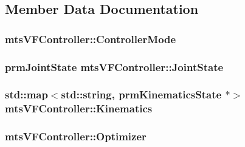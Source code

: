 \subsection{Member Data Documentation}
\hypertarget{classmts_v_f_controller_ad5340ab1ebdc9c7c0b1f66180ce70227}{
\subsubsection[{Controller\-Mode}]{ mts\-V\-F\-Controller\-::\-Controller\-Mode\hspace{0.3cm}{\ttfamily [protected]}}}\label{classmts_v_f_controller_ad5340ab1ebdc9c7c0b1f66180ce70227}
\hypertarget{classmts_v_f_controller_a1894d5892686513258336a288615a234}{
\subsubsection[{Joint\-State}]{\setlength{\rightskip}{0pt plus 5cm}prm\-Joint\-State mts\-V\-F\-Controller\-::\-Joint\-State\hspace{0.3cm}{\ttfamily [protected]}}}\label{classmts_v_f_controller_a1894d5892686513258336a288615a234}
\hypertarget{classmts_v_f_controller_af130251a32e9663507ab4d0ecf2c1ebe}{
\subsubsection[{Kinematics}]{\setlength{\rightskip}{0pt plus 5cm}std\-::map$<$std\-::string, prm\-Kinematics\-State $\ast$$>$ mts\-V\-F\-Controller\-::\-Kinematics\hspace{0.3cm}{\ttfamily [protected]}}}\label{classmts_v_f_controller_af130251a32e9663507ab4d0ecf2c1ebe}
\hypertarget{classmts_v_f_controller_a434d49f47dff20bbe715be76221a98ba}{
\subsubsection[{Optimizer}]{ mts\-V\-F\-Controller\-::\-Optimizer\hspace{0.3cm}{\ttfamily [protected]}}}\label{classmts_v_f_controller_a434d49f47dff20bbe715be76221a98ba}
